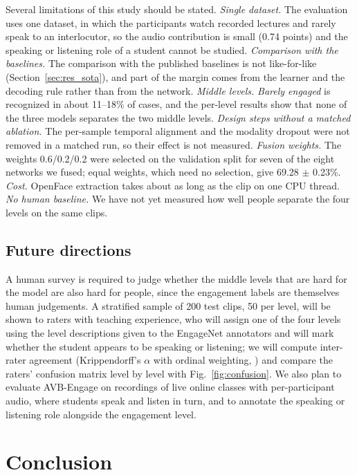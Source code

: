 \documentclass[pdflatex,iicol,sn-basic]{sn-jnl}
\newcommand{\ournet}{AVB-Engage}
\begin{document}
Several limitations of this study should be stated. \emph{Single dataset.} The evaluation uses one dataset, in which the participants watch recorded lectures and rarely speak to an interlocutor, so the audio contribution is small (0.74 points) and the speaking or listening role of a student cannot be studied. \emph{Comparison with the baselines.} The comparison with the published baselines is not like-for-like (Section~\ref{sec:res_sota}), and part of the margin comes from the learner and the decoding rule rather than from the network. \emph{Middle levels.} \emph{Barely engaged} is recognized in about 11--18\% of cases, and the per-level results show that none of the three models separates the two middle levels. \emph{Design steps without a matched ablation.} The per-sample temporal alignment and the modality dropout were not removed in a matched run, so their effect is not measured. \emph{Fusion weights.} The weights 0.6/0.2/0.2 were selected on the validation split for seven of the eight networks we fused; equal weights, which need no selection, give 69.28 $\pm$ 0.23\%. \emph{Cost.} OpenFace extraction takes about as long as the clip on one CPU thread. \emph{No human baseline.} We have not yet measured how well people separate the four levels on the same clips.

\subsection{Future directions}\label{sec:future}

A human survey is required to judge whether the middle levels that are hard for the model are also hard for people, since the engagement labels are themselves human judgements. A stratified sample of 200 test clips, 50 per level, will be shown to raters with teaching experience, who will assign one of the four levels using the level descriptions given to the EngageNet annotators and will mark whether the student appears to be speaking or listening; we will compute inter-rater agreement (Krippendorff's $\alpha$ with ordinal weighting, \citealp{krippendorff2019content}) and compare the raters' confusion matrix level by level with Fig.~\ref{fig:confusion}. We also plan to evaluate \ournet{} on recordings of live online classes with per-participant audio, where students speak and listen in turn, and to annotate the speaking or listening role alongside the engagement level.

\section{Conclusion}\label{sec:conclusion}
\end{document}
